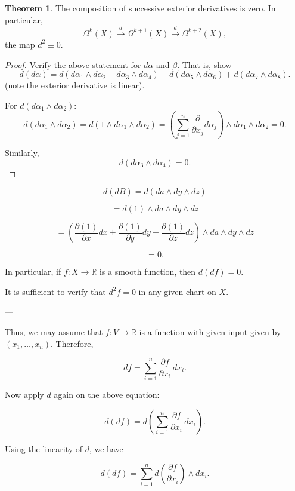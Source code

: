 \documentclass[11pt]{article}
\theoremstyle{definition}
\newtheorem{theorem}{Theorem}[section]
\theoremstyle{remark}
\begin{document}
\begin{theorem}\label{thm:exterior_derivatives_composition}
The composition of successive exterior derivatives is zero. In particular,
\[
\Omega^k(X) \xrightarrow{d} \Omega^{k+1}(X) \xrightarrow{d} \Omega^{k+2}(X),
\]
the map \(d^2 \equiv 0\).
\end{theorem}

\begin{proof}
Verify the above statement for \(d\alpha\) and \(\beta\). That is, show
\[
d(d\alpha) = d\left(d\alpha_1 \wedge d\alpha_2 + d\alpha_3 \wedge d\alpha_4\right) + d\left(d\alpha_5 \wedge d\alpha_6\right) + d\left(d\alpha_7 \wedge d\alpha_8\right).
\]
(note the exterior derivative is linear).

For \(d(d\alpha_1 \wedge d\alpha_2)\):
\[
d(d\alpha_1 \wedge d\alpha_2) = d(1 \wedge d\alpha_1 \wedge d\alpha_2)
= \left(\sum_{j=1}^n \frac{\partial}{\partial x_j} d\alpha_j\right) \wedge d\alpha_1 \wedge d\alpha_2 = 0.
\]

Similarly,
\[
d(d\alpha_3 \wedge d\alpha_4) = 0.
\]
\end{proof}

\[
d(dB) = d(da \wedge dy \wedge dz)
\]

\[
= d(1) \wedge da \wedge dy \wedge dz
\]

\[
= \left( \frac{\partial (1)}{\partial x} dx + \frac{\partial (1)}{\partial y} dy + \frac{\partial (1)}{\partial z} dz \right) \wedge da \wedge dy \wedge dz
\]

\[
= 0.
\]

In particular, if \( f: X \to \mathbb{R} \) is a smooth function, then \( d(df) = 0 \).

It is sufficient to verify that \( d^2 f = 0 \) in any given chart on \( X \).

---

Thus, we may assume that $f: V \to \mathbb{R}$ is a function with given input given by $(x_1, \dots, x_n)$. Therefore,

\[
df = \sum_{i=1}^n \frac{\partial f}{\partial x_i} \, dx_i.
\]

Now apply $d$ again on the above equation:

\[
d(df) = d\left(\sum_{i=1}^n \frac{\partial f}{\partial x_i} \, dx_i\right).
\]

Using the linearity of $d$, we have

\[
d(df) = \sum_{i=1}^n d\left(\frac{\partial f}{\partial x_i}\right) \wedge dx_i.
\]
\end{document}
